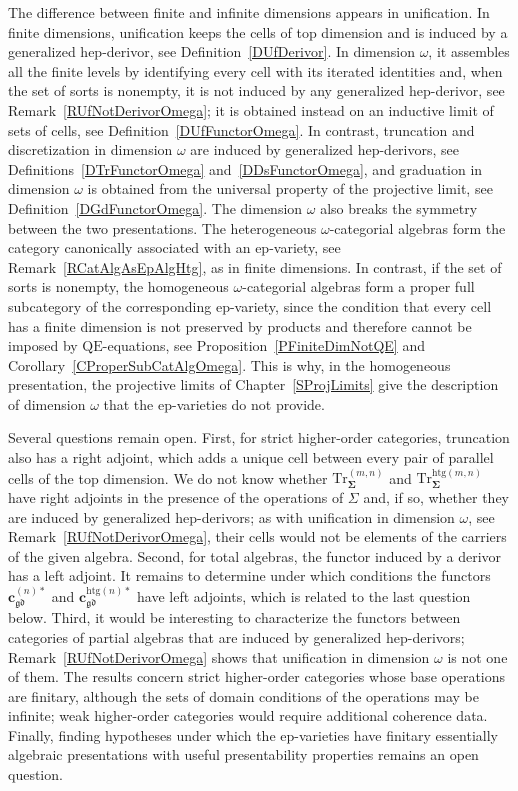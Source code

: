 \documentclass[a4paper, reqno]{amsbook}
\newcommand{\sig}[1]{\mathbf{#1}}             %
\newcommand{\QE}{\mathrm{QE}}
\newcommand{\gd}{\mathfrak{gd}}              %
\newcommand{\htg}{\mathrm{htg}}                %
\newcommand{\Tr}{\mathrm{Tr}}
\theoremstyle{plain}
\theoremstyle{definition}
\begin{document}
The difference between finite and infinite dimensions appears in unification.
In finite dimensions, unification keeps the cells of top dimension and is induced by a generalized hep-derivor, see Definition~\ref{DUfDerivor}.
In dimension $\omega$, it assembles all the finite levels by identifying every cell with its iterated identities and, when the set of sorts is nonempty, it is not induced by any generalized hep-derivor, see Remark~\ref{RUfNotDerivorOmega}; it is obtained instead on an inductive limit of sets of cells, see Definition~\ref{DUfFunctorOmega}.
In contrast, truncation and discretization in dimension $\omega$ are induced by generalized hep-derivors, see Definitions~\ref{DTrFunctorOmega} and~\ref{DDsFunctorOmega}, and graduation in dimension $\omega$ is obtained from the universal property of the projective limit, see Definition~\ref{DGdFunctorOmega}.
The dimension $\omega$ also breaks the symmetry between the two presentations.
The heterogeneous $\omega$-categorial algebras form the category canonically associated with an ep-variety, see Remark~\ref{RCatAlgAsEpAlgHtg}, as in finite dimensions.
In contrast, if the set of sorts is nonempty, the homogeneous $\omega$-categorial algebras form a proper full subcategory of the corresponding ep-variety, since the condition that every cell has a finite dimension is not preserved by products and therefore cannot be imposed by $\QE$-equations, see Proposition~\ref{PFiniteDimNotQE} and Corollary~\ref{CProperSubCatAlgOmega}.
This is why, in the homogeneous presentation, the projective limits of Chapter~\ref{SProjLimits} give the description of dimension $\omega$ that the ep-varieties do not provide.

Several questions remain open.
First, for strict higher-order categories, truncation also has a right adjoint, which adds a unique cell between every pair of parallel cells of the top dimension.
We do not know whether $\Tr^{(m,n)}_{\sig{\Sigma}}$ and $\Tr^{\htg(m,n)}_{\sig{\Sigma}}$ have right adjoints in the presence of the operations of $\Sigma$ and, if so, whether they are induced by generalized hep-derivors; as with unification in dimension $\omega$, see Remark~\ref{RUfNotDerivorOmega}, their cells would not be elements of the carriers of the given algebra.
Second, for total algebras, the functor induced by a derivor has a left adjoint.
It remains to determine under which conditions the functors $\mathbf{c}^{(n)\ast}_{\gd}$ and $\mathbf{c}^{\htg(n)\ast}_{\gd}$ have left adjoints, which is related to the last question below.
Third, it would be interesting to characterize the functors between categories of partial algebras that are induced by generalized hep-derivors; Remark~\ref{RUfNotDerivorOmega} shows that unification in dimension $\omega$ is not one of them.
The results concern strict higher-order categories whose base operations are finitary, although the sets of domain conditions of the operations may be infinite; weak higher-order categories would require additional coherence data.
Finally, finding hypotheses under which the ep-varieties have finitary essentially algebraic presentations with useful presentability properties remains an open question.



\end{document}
